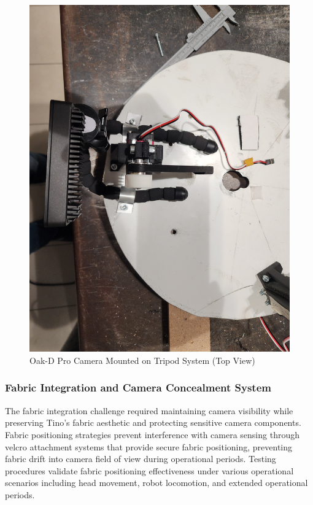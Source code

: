 \begin{figure}[H]
\begin{minipage}{0.45\textwidth}
        \includegraphics[width=\textwidth]{Images/TripodOnHeadCamera (2).jpg}
        \caption{Oak-D Pro Camera Mounted on Tripod System (Top View)}
        \label{fig:tripod_camera_mount_top}
    \end{minipage}
\end{figure}

\subsubsection{Fabric Integration and Camera Concealment System}

The fabric integration challenge required maintaining camera visibility while preserving Tino's fabric aesthetic and protecting sensitive camera components. Fabric positioning strategies prevent interference with camera sensing through velcro attachment systems that provide secure fabric positioning, preventing fabric drift into camera field of view during operational periods. Testing procedures validate fabric positioning effectiveness under various operational scenarios including head movement, robot locomotion, and extended operational periods.

